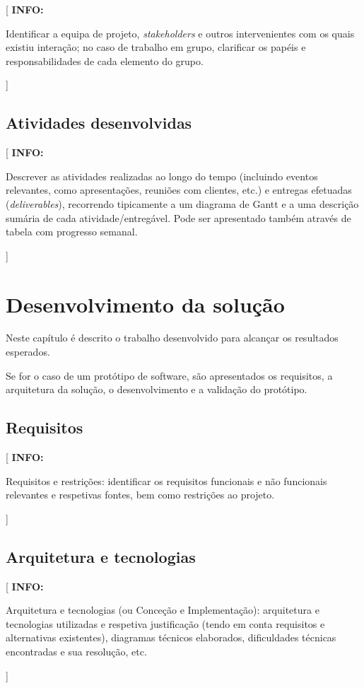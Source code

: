 \documentclass[11pt,a4paper]{report}
\newenvironment{info}[1]{\vspace*{6mm}\color{blue}[ \textbf{INFO:} \begin{em} #1}
                        {\vspace*{3mm}\end{em} ]}
\begin{document}
\begin{info}
Identificar a equipa de projeto, \emph{stakeholders} e outros
intervenientes com os quais existiu interação; no caso de trabalho em
grupo, clarificar os papéis e responsabilidades de cada elemento do grupo.
\end{info}

\section{Atividades desenvolvidas}

\begin{info}
Descrever as atividades realizadas ao longo do tempo (incluindo
eventos relevantes, como apresentações, reuniões com clientes, etc.)
e entregas efetuadas (\emph{deliverables}), recorrendo tipicamente a
um diagrama de Gantt e a uma descrição sumária de cada
atividade/entregável.
Pode ser apresentado também através de tabela com progresso semanal.
\end{info}


\chapter{Desenvolvimento da solução}

Neste capítulo é descrito o trabalho desenvolvido para alcançar os
resultados esperados.

Se for o caso de um protótipo de software, são apresentados os
requisitos, a arquitetura da solução, o desenvolvimento e a validação
do protótipo.

\section{Requisitos}

\begin{info}
Requisitos e restrições: identificar os requisitos funcionais e não
funcionais relevantes e respetivas fontes, bem como restrições ao projeto. 
\end{info}

\section{Arquitetura e tecnologias}

\begin{info}
Arquitetura e tecnologias (ou Conceção e Implementação): arquitetura e
tecnologias utilizadas e respetiva justificação (tendo em conta
requisitos e alternativas existentes), diagramas técnicos elaborados,
dificuldades técnicas encontradas e sua resolução, etc. 
\end{info}
\end{document}
